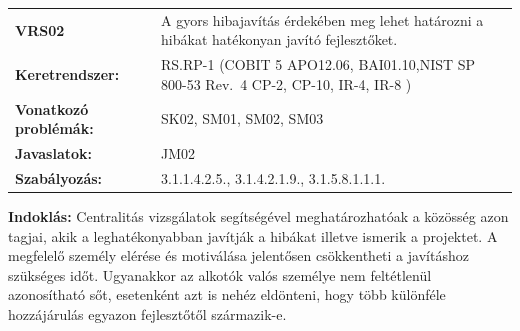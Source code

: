 \documentclass[12pt,magyar,a4paper,oneside]{scrreprt}
\begin{document}
\begin{longtable}[]{@{}ll@{}}
\toprule
\endhead
\begin{minipage}[t]{0.16\columnwidth}\raggedright
\textbf{VRS02}\strut
\end{minipage} & \begin{minipage}[t]{0.79\columnwidth}\raggedright
A gyors hibajavítás érdekében meg lehet határozni a hibákat hatékonyan
javító fejlesztőket.\strut
\end{minipage}\tabularnewline
\begin{minipage}[t]{0.16\columnwidth}\raggedright
\textbf{Keretrendszer:}\strut
\end{minipage} & \begin{minipage}[t]{0.79\columnwidth}\raggedright
RS.RP-1 (COBIT 5 APO12.06, BAI01.10,NIST SP 800-53 Rev.~4 CP-2, CP-10,
IR-4, IR-8 )\strut
\end{minipage}\tabularnewline
\begin{minipage}[t]{0.16\columnwidth}\raggedright
\textbf{Vonatkozó problémák:}\strut
\end{minipage} & \begin{minipage}[t]{0.79\columnwidth}\raggedright
SK02, SM01, SM02, SM03\strut
\end{minipage}\tabularnewline
\begin{minipage}[t]{0.16\columnwidth}\raggedright
\textbf{Javaslatok:}\strut
\end{minipage} & \begin{minipage}[t]{0.79\columnwidth}\raggedright
JM02\strut
\end{minipage}\tabularnewline
\begin{minipage}[t]{0.16\columnwidth}\raggedright
\textbf{Szabályozás:}\strut
\end{minipage} & \begin{minipage}[t]{0.79\columnwidth}\raggedright
3.1.1.4.2.5., 3.1.4.2.1.9., 3.1.5.8.1.1.1.\strut
\end{minipage}\tabularnewline
\bottomrule
\end{longtable}

\textbf{Indoklás: } Centralitás vizsgálatok segítségével
meghatározhatóak a közösség azon tagjai, akik a leghatékonyabban
javítják a hibákat illetve ismerik a projektet. A megfelelő személy
elérése és motiválása jelentősen csökkentheti a javításhoz szükséges
időt. Ugyanakkor az alkotók valós személye nem feltétlenül azonosítható
sőt, esetenként azt is nehéz eldönteni, hogy több különféle hozzájárulás
egyazon fejlesztőtől származik-e.
\end{document}
